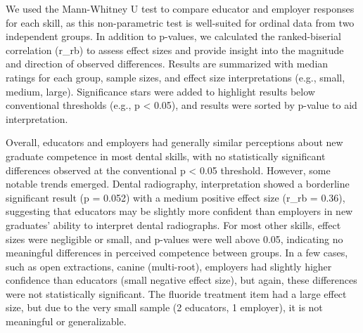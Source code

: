 \documentclass[
  12pt,
  letterpaper,
  DIV=11,
  numbers=noendperiod]{scrartcl}
\numberwithin{figure}{section}
\numberwithin{table}{section}
\begin{document}
We used the Mann-Whitney U test to compare educator and employer
responses for each skill, as this non-parametric test is well-suited for
ordinal data from two independent groups. In addition to p-values, we
calculated the ranked-biserial correlation (r\_rb) to assess effect
sizes and provide insight into the magnitude and direction of observed
differences. Results are summarized with median ratings for each group,
sample sizes, and effect size interpretations (e.g., small, medium,
large). Significance stars were added to highlight results below
conventional thresholds (e.g., p \textless{} 0.05), and results were
sorted by p-value to aid interpretation.

Overall, educators and employers had generally similar perceptions about
new graduate competence in most dental skills, with no statistically
significant differences observed at the conventional p \textless{} 0.05
threshold. However, some notable trends emerged. Dental radiography,
interpretation showed a borderline significant result (p = 0.052) with a
medium positive effect size (r\_rb = 0.36), suggesting that educators
may be slightly more confident than employers in new graduates' ability
to interpret dental radiographs. For most other skills, effect sizes
were negligible or small, and p-values were well above 0.05, indicating
no meaningful differences in perceived competence between groups. In a
few cases, such as open extractions, canine (multi-root), employers had
slightly higher confidence than educators (small negative effect size),
but again, these differences were not statistically significant. The
fluoride treatment item had a large effect size, but due to the very
small sample (2 educators, 1 employer), it is not meaningful or
generalizable.
\end{document}
